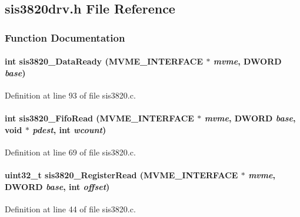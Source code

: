 \subsection{sis3820drv.h File Reference}
\label{sis3820drv_8h}


\subsubsection{Function Documentation}
\paragraph[{sis3820\_\-DataReady}]{\setlength{\rightskip}{0pt plus 5cm}int sis3820\_\-DataReady ({\bf MVME\_\-INTERFACE} $\ast$ {\em mvme}, \/  {\bf DWORD} {\em base})}\hfill\label{sis3820drv_8h_ade83db7a833268f5f3942062cb5c8fe0}


Definition at line 93 of file sis3820.c.
\paragraph[{sis3820\_\-FifoRead}]{\setlength{\rightskip}{0pt plus 5cm}int sis3820\_\-FifoRead ({\bf MVME\_\-INTERFACE} $\ast$ {\em mvme}, \/  {\bf DWORD} {\em base}, \/  void $\ast$ {\em pdest}, \/  int {\em wcount})}\hfill\label{sis3820drv_8h_a4c633bebb10ba1fb3c9a68567c7fb3bf}


Definition at line 69 of file sis3820.c.
\paragraph[{sis3820\_\-RegisterRead}]{\setlength{\rightskip}{0pt plus 5cm}uint32\_\-t sis3820\_\-RegisterRead ({\bf MVME\_\-INTERFACE} $\ast$ {\em mvme}, \/  {\bf DWORD} {\em base}, \/  int {\em offset})}\hfill\label{sis3820drv_8h_aecea42f29316112f54ecae314d105ff1}


Definition at line 44 of file sis3820.c.
